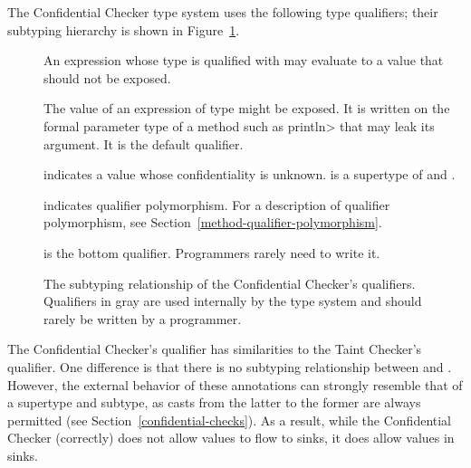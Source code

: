 The Confidential Checker type system uses the following type qualifiers;
their subtyping hierarchy is shown in
Figure~\ref{fig-confidential-hierarchy}.

\begin{description}
\item[]
    An expression whose type is qualified with
     may evaluate to
    a value that should not be exposed.
\item[]
    The value of an expression of type
     might be
    exposed.  It is written on the formal parameter type of a method such
    as \<println> that may leak its argument.  It is the default qualifier.
\item[]
    indicates a value whose confidentiality is unknown.
     is a supertype of 
    and .
\item[]
    indicates qualifier polymorphism. For a description of qualifier polymorphism,
    see Section~\ref{method-qualifier-polymorphism}.
\item[]
    is the bottom qualifier. Programmers rarely need to write it.
\end{description}


\begin{figure}
\caption{The subtyping relationship of the Confidential Checker's qualifiers.
  Qualifiers in gray are used internally by the type system and should rarely
  be written by a programmer.}
\label{fig-confidential-hierarchy}
\end{figure}

The Confidential Checker's
 qualifier has similarities to the Taint Checker's 
qualifier.  One difference is that
there is no subtyping relationship between  and
. However, the external behavior of these annotations
can strongly resemble that of a supertype and subtype, as casts from the latter
to the former are always permitted (see Section~\ref{confidential-checks}). As
a result, while the Confidential Checker (correctly) does not allow
 values to flow to  sinks, it does
allow  values in  sinks.

